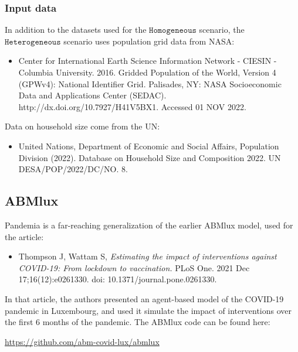 \documentclass[10pt,letterpaper]{article}
\begin{document}
\subsubsection*{Input data}

\noindent In addition to the datasets used for the $\texttt{Homogeneous}$ scenario, the $\texttt{Heterogeneous}$ scenario uses population grid data from NASA:

\begin{itemize}
\item[] Center for International Earth Science Information Network - CIESIN - Columbia University. 2016. Gridded Population of the World, Version 4 (GPWv4): National Identifier Grid. Palisades, NY: NASA Socioeconomic Data and Applications Center (SEDAC). http://dx.doi.org/10.7927/H41V5BX1. Accessed 01 NOV 2022.
\end{itemize}

\noindent Data on household size come from the UN:

\begin{itemize}
\item[] United Nations, Department of Economic and Social Affairs, Population Division (2022). Database on Household Size and Composition 2022. UN DESA/POP/2022/DC/NO. 8.
\end{itemize}

\subsection{ABMlux}

Pandemia is a far-reaching generalization of the earlier ABMlux model, used for the article:
\begin{itemize}
\item[] Thompson J, Wattam S, \textit{Estimating the impact of interventions against COVID-19: From lockdown to vaccination.} PLoS One. 2021 Dec 17;16(12):e0261330. doi: 10.1371/journal.pone.0261330.
\end{itemize}
In that article, the authors presented an agent-based model of the COVID-19 pandemic in Luxembourg, and used it simulate the impact of interventions over the first 6 months of the pandemic. The ABMlux code can be found here:
\begin{center}
\url{https://github.com/abm-covid-lux/abmlux}
\end{center}
\end{document}
